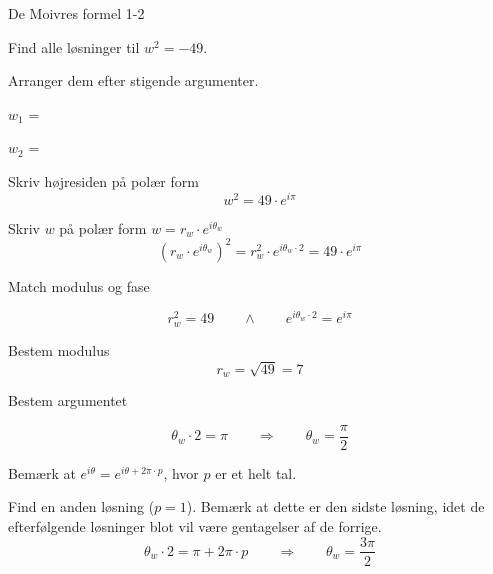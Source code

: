 \documentclass{article}
\begin{document}
\newpage

\begin{exercise}{De Moivres formel 1-2}

Find alle løsninger til $w^2=-49$. 

Arranger dem efter stigende argumenter.

$w_1$ = 		

$w_2$ = 		


\hint 

Skriv højresiden på polær form
\[
w^2 = 49 \cdot e^{i \pi}
\]


\hint

Skriv $w$ på polær form $w = r_w \cdot e^{i \theta_w}$
\[
\left(r_w \cdot e^{i \theta_w}\right)^2 = r_w^2 \cdot e^{i \theta_w \cdot 2} = 49 \cdot e^{i \pi}
\]

\hint 
Match modulus og fase

\[
r_w^2 = 49 \qquad \wedge \qquad e^{i \theta_w \cdot 2} = e^{i \pi}
\]

\hint

Bestem modulus
\[
r_w  =  \sqrt{49} = 7
\]

\hint

Bestem argumentet

\[
\theta_w \cdot 2 = \pi \qquad \Rightarrow \qquad  \theta_w = \frac{\pi}{2}
\]

\hint

Bemærk at $e^{i \theta} = e^{i \theta + 2 \pi \cdot p}$, hvor $p$ er et helt tal.

\hint

Find en anden løsning ($p=1$). 
Bemærk at dette er den sidste løsning, idet de efterfølgende 
løsninger blot vil være gentagelser af de forrige. 
\[
\theta_w \cdot 2 = \pi  + 2 \pi \cdot p \qquad \Rightarrow \qquad  \theta_w = \frac{3 \pi}{2}
\]


\end{exercise}

\newpage
\end{document}

